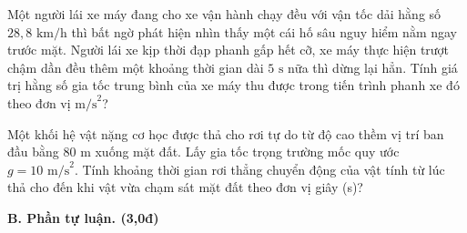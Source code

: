 	\begin{ex}%
		Một người lái xe máy đang cho xe vận hành chạy đều với vận tốc dải hằng số $28,8\text{ km/h}$ thì bất ngờ phát hiện nhìn thấy một cái hố sâu nguy hiểm nằm ngay trước mặt. Người lái xe kịp thời đạp phanh gấp hết cỡ, xe máy thực hiện trượt chậm dần đều thêm một khoảng thời gian dài $5\text{ s}$ nữa thì dừng lại hẳn. Tính giá trị hằng số gia tốc trung bình của xe máy thu được trong tiến trình phanh xe đó theo đơn vị $\text{m/s}^2$?
	\end{ex}
	
	\begin{ex}%
		Một khối hệ vật nặng cơ học được thả cho rơi tự do từ độ cao thềm vị trí ban đầu bằng $80\text{ m}$ xuống mặt đất. Lấy gia tốc trọng trường mốc quy ước $g=10\text{ m/s}^2$. Tính khoảng thời gian rơi thẳng chuyển động của vật tính từ lúc thả cho đến khi vật vừa chạm sát mặt đất theo đơn vị giây (s)?
	\end{ex}
	
	
	\noindent \textbf{B. Phần tự luận. (3,0đ)}
	\vspace{0.2cm}
	

